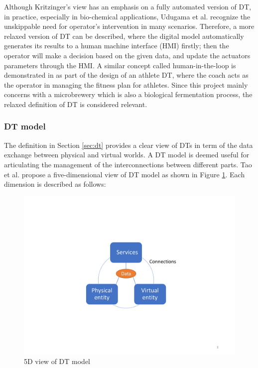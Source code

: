 \documentclass[journal,onecolumn]{IEEEtran} %
\begin{document}
Although Kritzinger's view has an emphasis on a fully automated version of DT, in practice, especially in bio-chemical applications, Udugama et al. \cite{Udugama2020} \cite{Udugama2021} recognize the unskippable need for operator's intervention in many scenarios. Therefore, a more relaxed version of DT can be described, where the digital model automatically generates its results to a human machine interface (HMI) firstly; then the operator will make a decision based on the given data, and update the actuators parameters through the HMI. A similar concept called human-in-the-loop is demonstrated in \cite{Barricelli2020} as part of the design of an athlete DT, where the coach acts as the operator in managing the fitness plan for athletes. Since this project mainly concerns with a microbrewery which is also a biological fermentation process, the relaxed definition of DT is considered relevant.       

\subsubsection{DT model} \label{sec:dtmodel}
The definition in Section \ref{sec:dt} provides a clear view of DTs in term of the data exchange between physical and virtual worlds. A DT model is deemed useful for articulating the management of the interconnections between different parts. Tao et al. \cite{Tao2017} propose a five-dimensional view of DT model as shown in Figure \ref{fig:tao5d}. Each dimension is described as follows:

\begin{figure}[hbt!]
  \centering
  \includegraphics[scale=0.6]{figures/tao5d.pdf}
  \caption{5D view of DT model}
  \label{fig:tao5d}
\end{figure}
\end{document}
